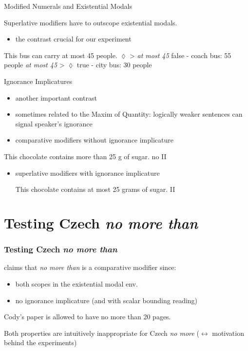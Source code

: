 \documentclass[10pt
]{beamer}
\begin{document}
\begin{frame}{Modified Numerals and Existential Modals}

  Superlative modifiers have to outscope existential modals.

  \begin{itemize}
    \item the contrast crucial for our experiment
  \end{itemize}
  
  
   \pex This bus can carry at most 45 people.
    \a *$\lozenge$ > \textit{at most 45} \hfill false - coach bus: 55 people
    \a \textit{at most 45} > $\lozenge$ \hfill true - city bus: 30 people
    \xe
  
  \footnotesize
  
  \footnotesize
  \cite{geurts2007least,blok2019scope}
  
  
  \end{frame}
  

\begin{frame}{Ignorance Implicatures}
\begin{itemize}
    \item another important contrast
    \item sometimes related to the Maxim of Quantity: logically weaker sentences can signal speaker's ignorance
    \item comparative modifiers without ignorance implicature
\end{itemize}

\ex 
This chocolate contains more than 25 g of sugar. \hfill no II
\xe

\begin{itemize}
    \item superlative modifiers with ignorance implicature

\ex This chocolate contains at most 25 grams of sugar. \hfill II
\xe 

\end{itemize}
\end{frame}


\section{Testing Czech \textit{no more than}}

\begin{frame}
  \frametitle{Testing Czech \textit{no more than}}

  \cite{nouwen2008upper} claims that \textit{no more than} is a comparative modifier since:

  \begin{itemize}
    \item both scopes in the existential modal env.
    \item no ignorance implicature (and with scalar bounding reading)
  \end{itemize}

\ex  Cody’s paper is allowed to have no more than 20 pages.  
\xe  

Both properties are intuitively inappropriate for Czech \textit{no more} ($\leftrightarrow$ motivation behind the experiments)

\end{frame}
\end{document}
